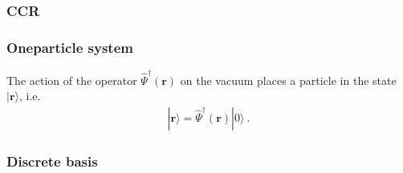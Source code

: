 \documentclass[letterpaper,10pt,english]{jupyterBook}
\begin{document}
\subsubsection{CCR}
\label{\detokenize{ch/quantum-mechanics/many-body/quantum-fields:ccr}}

\subsubsection{One\sphinxhyphen{}particle system}
\label{\detokenize{ch/quantum-mechanics/many-body/quantum-fields:one-particle-system}}
\sphinxAtStartPar
{} The action of the operator \(\hat{\Psi}^\dagger(\mathbf{r})\) on the vacuum places a particle in the state \(| \mathbf{r} \rangle\), i.e.
\begin{equation}\label{equation:ch/quantum-mechanics/many-body/quantum-fields:eq:second-quantization:field:r-1}
\begin{split}| \mathbf{r} \rangle = \hat{\Psi}^\dagger(\mathbf{r}) | 0 \rangle \ .\end{split}
\end{equation}\subsubsection*{Discrete basis}
\end{document}
